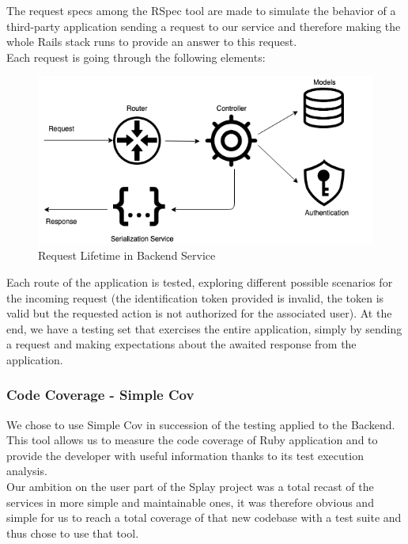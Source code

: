 \documentclass{eplmastersthesis}
\begin{document}
          The request specs among the RSpec tool are made to simulate
          the behavior of a third-party application sending a request to
          our service and therefore making the whole Rails stack runs
          to provide an answer to this request.\\
          Each request is going through the following elements:\\

          \begin{figure}[H]
            \centering
            \includegraphics[scale=0.6]{figures/request_test.png}
            \caption{\label{request_test} Request Lifetime in Backend Service}
          \end{figure}

          Each route of the application is tested, exploring different possible
          scenarios for the incoming request (the identification token provided
          is invalid, the token is valid but the requested action is not
          authorized for the associated user). At the end, we have a testing set
          that exercises the entire application, simply by sending a request and
          making expectations about the awaited response from the application.

        \subsubsection{Code Coverage - Simple Cov}

          We chose to use Simple Cov in succession of the testing applied to
          the Backend. This tool allows us to measure the code coverage of Ruby
          application and to provide the developer with useful information
          thanks to its test execution analysis.\\

          Our ambition on the user part of the Splay project was a total recast of
          the services in more simple and maintainable ones, it was therefore
          obvious and simple for us to reach a total coverage of that new codebase
          with a test suite and thus chose to use that tool.\\
\end{document}
